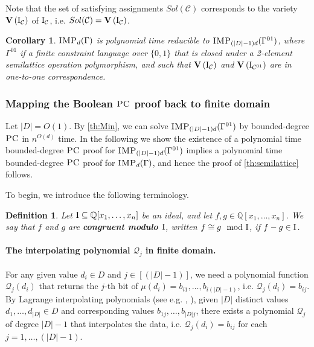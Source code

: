 \documentclass[11pt]{article}
\newcommand{\Cc}{\mathcal{C}}
\newcommand{\IMP}{\textsc{IMP}}
\newcommand{\PC}{\textsc{PC}}
\newcommand{\Variety}[1]{{\textbf{V}}\left( #1 \right)}
\newcommand{\I}{\emph{$\rm{I}$}}
\newcommand{\1}{\textbf{1}}
\newcommand{\Field}{\mathbb{Q}}
\newcommand\q{\mathcal{Q}}
\newcommand\uval{{(|D|-1)}}
\newtheorem{definition}[theorem]{Definition}
\newtheorem{corollary}[theorem]{Corollary}
\begin{document}
%
Note that the set of satisfying assignments $Sol(\Cc)$ corresponds to the variety $\Variety{\I_\Cc}$ of $\I_\Cc$, i.e. $Sol(\Cc)=\Variety{\I_\Cc}$. 
\begin{corollary}\label{th:imp_red}
 $\IMP_d(\Gamma)$ is polynomial time reducible to $\IMP_{\uval d}(\Gamma^{01})$, where $\Gamma^{01}$ if a finite constraint language over $\{0, 1\}$ that is closed under  a 2-element semilattice operation polymorphism, and such that $\Variety{\I_\Cc}$ and $\Variety{\I_{\Cc^{01}}}$ are in one-to-one correspondence. 
\end{corollary}

\subsubsection[Mapping the Boolean PC proof back to finite domain]{Mapping the Boolean $\PC$ proof back to finite domain}\label{sect:mappingBack}
Let $|D|=O(1)$. By \cref{th:Min}, we can solve $\IMP_{\uval d}(\Gamma^{01})$ by bounded-degree $\PC$ in $n^{O(d)}$ time. In the following we show the existence of a polynomial time bounded-degree $\PC$ proof for $\IMP_{\uval d}(\Gamma^{01})$ implies a polynomial time bounded-degree $\PC$ proof for $\IMP_{d}(\Gamma)$, and hence the proof of \cref{th:semilattice} follows.

To begin, we introduce the following terminology.
%
\begin{definition}
    Let $\I\subseteq \Field[x_1, \ldots, x_n]$ be an ideal, and let $f,g\in \Field[x_1, \ldots, x_n]$. We say that $f$ and $g$ are \textbf{\emph{congruent modulo $\I$}}, written $f\cong g \mod{\I}$, if $f-g\in \I$.
\end{definition}

\paragraph{The interpolating polynomial $\q_j$ in finite domain.}
For any given value $d_i\in D$ and $j\in [\uval]$, we need a polynomial function $\q_j(d_i)$ that returns the $j$-th bit of $\mu(d_i)=b_{i1},\ldots,b_{i\uval}$, i.e. $\q_j(d_i)=b_{ij}$.
%
By Lagrange interpolating polynomials (see e.g. \cite{phillips2003interpolation}, \cite{Gasca2000-hx}), given $|D|$ distinct values  $d_1,\ldots,d_{|D|}\in D$ and corresponding values $b_{1j},\ldots,b_{|D|j}$, there exists a polynomial $\q_j$ of degree $|D|-1$ that interpolates the data, i.e. $\q_j(d_i)=b_{ij}$ for each $j=1,\ldots,\uval$.
\end{document}
